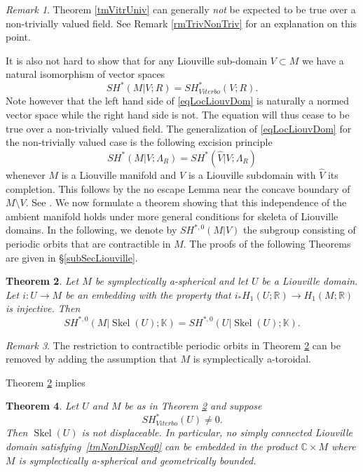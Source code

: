 \documentclass[11pt]{amsart}
\newcommand{\R}{\mathbb{R}}
\newcommand{\C}{\mathbb{C}}
\DeclareMathOperator{\Skel}{Skel}
\newtheorem{tm}{Theorem}[section]
\theoremstyle{definition}
\theoremstyle{remark}
\newtheorem{rem}[tm]{Remark}
\begin{document}

\begin{rem}
Theorem \ref{tmVitrUniv} can generally \textit{not} be expected to be true over a non-trivially valued field. See Remark \ref{rmTrivNonTriv} for an explanation on this point.
\end{rem}
It is also not hard to show that for any Liouville sub-domain $V\subset M$ we have a natural isomorphism of vector spaces
\begin{equation}\label{eqLocLiouvDom}
SH^*(M|V;R)=SH^*_{Viterbo}(V;R).
\end{equation}
Note however that the left hand side of \eqref{eqLocLiouvDom} is naturally a normed vector space while the right hand side is not. The equation will thus cease to be  true over a non-trivially valued field. The generalization of \eqref{eqLocLiouvDom} for the non-trivially valued case is the following excision principle
\begin{equation}\label{eqLocLiouvDomNT}
SH^*(M|V;\Lambda_R)=SH^*(\hat{V}|V;\Lambda_R)
\end{equation}
whenever $M$ is a Liouville manifold and $V$ is a Liouville subdomain with $\hat{V}$ its completion. This follows by the no escape Lemma near the concave boundary of $M\setminus V$. See \cite{Ritter13}. We now formulate a theorem showing that this independence of the ambient manifold holds under more general conditions for skeleta of Liouville domains. In the following, we denote by $SH^{*,0}(M|V)$ the subgroup consisting of periodic orbits that are contractible in $M$. The proofs of the following Theorems are given in \S \ref{subSecLiouville}.
\begin{tm}\label{tmSkellVitFunc}
Let $M$ be symplectically a-spherical and let $U$ be a Liouville domain. Let $i:U\to M$ be an embedding with the property that $i_*H_1(U;\R)\to H_1(M;\R)$ is injective. Then
\[
SH^{*,0}(M|\Skel(U);\mathbb{K})=SH^{*,0}(U|\Skel(U);\mathbb{K}).
\]
\end{tm}
\begin{rem}
The restriction to contractible periodic orbits in Theorem \ref{tmSkellVitFunc} can be removed by adding the assumption that $M$ is symplectically a-toroidal.
\end{rem}
Theorem \ref{tmSkellVitFunc} implies
\begin{tm}\label{tmLiouSubNondisp}
Let $U$ and $M$ be as in Theorem \ref{tmSkellVitFunc} and suppose
\begin{equation}\label{tmNonDispNeq0}
SH^*_{Viterbo}(U)\neq 0.
\end{equation}
Then $\Skel(U)$ is not displaceable.  In particular, no simply connected Liouville domain satisfying~\eqref{tmNonDispNeq0} can be embedded in the product $\C\times M$ where $M$ is symplectically a-spherical and geometrically bounded.
\end{tm}
\end{document}
